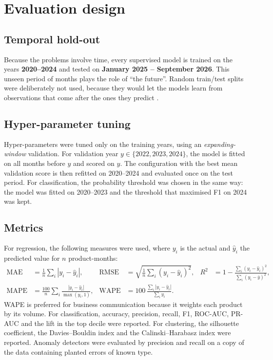\section{Evaluation design}
\subsection{Temporal hold-out}
Because the problems involve time, every supervised model is trained on the years \textbf{2020--2024} and
tested on \textbf{January 2025 -- September 2026}. This unseen period of \TestMonths months plays the role of
``the future''. Random train/test splits were deliberately not used, because they would let the models learn
from observations that come after the ones they predict \citep{bergmeir2012}.

\subsection{Hyper-parameter tuning}
Hyper-parameters were tuned only on the training years, using an \emph{expanding-window} validation. For
validation year $y \in \{2022, 2023, 2024\}$, the model is fitted on all months before $y$ and scored on $y$.
The configuration with the best mean validation score is then refitted on 2020--2024 and evaluated once on the
test period. For classification, the probability threshold was chosen in the same way: the model was fitted on
2020--2023 and the threshold that maximised F1 on 2024 was kept.

\subsection{Metrics}
For regression, the following measures were used, where $y_i$ is the actual and $\hat y_i$ the predicted value
for $n$ product-months:
\begin{align*}
\text{MAE} &= \tfrac{1}{n}\textstyle\sum_i |y_i-\hat y_i|, &
\text{RMSE} &= \sqrt{\tfrac{1}{n}\textstyle\sum_i (y_i-\hat y_i)^2}, &
R^2 &= 1-\frac{\sum_i (y_i-\hat y_i)^2}{\sum_i (y_i-\bar y)^2},\\
\text{MAPE} &= \tfrac{100}{n}\textstyle\sum_i \frac{|y_i-\hat y_i|}{\max(y_i,1)}, &
\text{WAPE} &= 100\,\frac{\sum_i |y_i-\hat y_i|}{\sum_i y_i}. &&
\end{align*}
WAPE is preferred for business communication because it weights each product by its volume. For
classification, accuracy, precision, recall, F1, ROC-AUC, PR-AUC and the lift in the top decile were reported.
For clustering, the silhouette coefficient, the Davies--Bouldin index and the Calinski--Harabasz index were
reported. Anomaly detectors were evaluated by precision and recall on a copy of the data containing planted
errors of known type.

